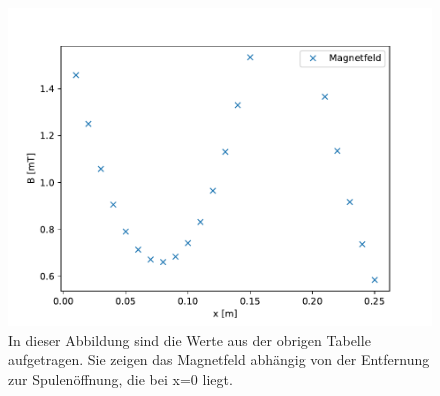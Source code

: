 \documentclass[titlepage = firstcover]{scrartcl}
\begin{document}
                \begin{figure}[h]
                    \centering
                    \includegraphics{HelmholtzC.pdf}
                    \caption{In dieser Abbildung sind die Werte aus der obrigen Tabelle aufgetragen. Sie zeigen das Magnetfeld abhängig von der Entfernung zur Spulenöffnung, die bei x=0 liegt.}
                    \label{fig:HelmholtzC}
    
                \end{figure}
    
                \FloatBarrier
                \newpage
                    
\end{document}
